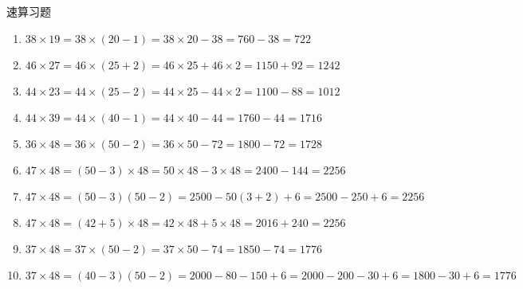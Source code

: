 \documentclass[aspectratio=169]{ctexbeamer} %
\begin{document}
\begin{frame}[t]{速算习题}
\begin{spacing}{1.2}
\normalsize
\begin{enumerate}[label={\arabic*.}]
\item $ 38 \times 19 =  38 \times (20-1) = 38 \times 20 - 38 = 760 - 38 = 722$
\item $ 46 \times 27 =  46 \times (25+2) = 46 \times 25 + 46 \times 2 = 1150 + 92 = 1242$
\item $ 44 \times 23 =  44 \times (25-2) = 44 \times 25 - 44 \times 2 = 1100 - 88 = 1012$
\item $ 44 \times 39 =  44 \times (40-1) = 44 \times 40 - 44 = 1760 -44 = 1716$
\item $ 36 \times 48 =  36 \times (50-2) = 36 \times 50 - 72 = 1800 - 72 = 1728$
\item $ 47 \times 48 =  (50-3) \times 48 = 50 \times 48 - 3 \times 48 = 2400 - 144 = 2256$
\item $ 47 \times 48 =  (50-3)(50-2) = 2500 - 50(3+2) + 6 = 2500 - 250 + 6 = 2256$
\item $ 47 \times 48 =  (42+5) \times 48 = 42 \times 48 + 5 \times 48 =  2016 + 240 = 2256$
\item $ 37 \times 48 =  37 \times (50-2) = 37 \times 50 - 74 = 1850 - 74 = 1776$
\item $ 37 \times 48 =  (40-3)(50-2) = 2000 - 80 - 150 + 6 = 2000 - 200 - 30 + 6 = 1800 - 30 + 6 = 1776$
\end{enumerate}

\end{spacing}
\end{frame}
\end{document}
